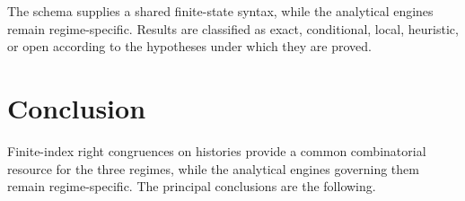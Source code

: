 \documentclass[12pt]{article}
\theoremstyle{definition}
\begin{document}
The schema supplies a shared finite-state syntax, while the analytical engines
remain regime-specific.  Results are classified as exact, conditional, local,
heuristic, or open according to the hypotheses under which they are proved.

\section{Conclusion}
\label{sec:conclusion}

Finite-index right congruences on histories provide a common combinatorial
resource for the three regimes, while the analytical engines governing them
remain regime-specific.  The principal conclusions are the following.
\end{document}
